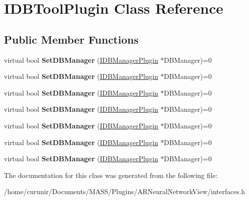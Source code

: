 \hypertarget{class_i_d_b_tool_plugin}{}\section{I\+D\+B\+Tool\+Plugin Class Reference}
\label{class_i_d_b_tool_plugin}
\subsection*{Public Member Functions}
\begin{DoxyCompactItemize}
\item 
virtual bool {\bfseries Set\+D\+B\+Manager} (\hyperlink{class_i_d_b_manager_plugin}{I\+D\+B\+Manager\+Plugin} $\ast$D\+B\+Manager)=0\hypertarget{class_i_d_b_tool_plugin_ae7c5693728988f5aa46065fed7a8ca99}{}\label{class_i_d_b_tool_plugin_ae7c5693728988f5aa46065fed7a8ca99}

\item 
virtual bool {\bfseries Set\+D\+B\+Manager} (\hyperlink{class_i_d_b_manager_plugin}{I\+D\+B\+Manager\+Plugin} $\ast$D\+B\+Manager)=0\hypertarget{class_i_d_b_tool_plugin_ae7c5693728988f5aa46065fed7a8ca99}{}\label{class_i_d_b_tool_plugin_ae7c5693728988f5aa46065fed7a8ca99}

\item 
virtual bool {\bfseries Set\+D\+B\+Manager} (\hyperlink{class_i_d_b_manager_plugin}{I\+D\+B\+Manager\+Plugin} $\ast$D\+B\+Manager)=0\hypertarget{class_i_d_b_tool_plugin_ae7c5693728988f5aa46065fed7a8ca99}{}\label{class_i_d_b_tool_plugin_ae7c5693728988f5aa46065fed7a8ca99}

\item 
virtual bool {\bfseries Set\+D\+B\+Manager} (\hyperlink{class_i_d_b_manager_plugin}{I\+D\+B\+Manager\+Plugin} $\ast$D\+B\+Manager)=0\hypertarget{class_i_d_b_tool_plugin_ae7c5693728988f5aa46065fed7a8ca99}{}\label{class_i_d_b_tool_plugin_ae7c5693728988f5aa46065fed7a8ca99}

\item 
virtual bool {\bfseries Set\+D\+B\+Manager} (\hyperlink{class_i_d_b_manager_plugin}{I\+D\+B\+Manager\+Plugin} $\ast$D\+B\+Manager)=0\hypertarget{class_i_d_b_tool_plugin_ae7c5693728988f5aa46065fed7a8ca99}{}\label{class_i_d_b_tool_plugin_ae7c5693728988f5aa46065fed7a8ca99}

\item 
virtual bool {\bfseries Set\+D\+B\+Manager} (\hyperlink{class_i_d_b_manager_plugin}{I\+D\+B\+Manager\+Plugin} $\ast$D\+B\+Manager)=0\hypertarget{class_i_d_b_tool_plugin_ae7c5693728988f5aa46065fed7a8ca99}{}\label{class_i_d_b_tool_plugin_ae7c5693728988f5aa46065fed7a8ca99}

\item 
virtual bool {\bfseries Set\+D\+B\+Manager} (\hyperlink{class_i_d_b_manager_plugin}{I\+D\+B\+Manager\+Plugin} $\ast$D\+B\+Manager)=0\hypertarget{class_i_d_b_tool_plugin_ae7c5693728988f5aa46065fed7a8ca99}{}\label{class_i_d_b_tool_plugin_ae7c5693728988f5aa46065fed7a8ca99}

\end{DoxyCompactItemize}


The documentation for this class was generated from the following file\+:\begin{DoxyCompactItemize}
\item 
/home/curunir/\+Documents/\+M\+A\+S\+S/\+Plugins/\+A\+R\+Neural\+Network\+View/interfaces.\+h\end{DoxyCompactItemize}
